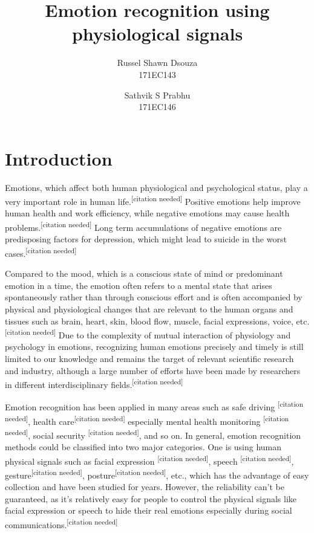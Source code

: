 \documentclass[11pt]{article}
\title{\textbf{Emotion recognition using physiological signals}}
\author{
  Russel Shawn Dsouza\\
  171EC143
  \and
  Sathvik S Prabhu\\
  171EC146
}
\date{}
\theoremstyle{definition}
\begin{document}
  \maketitle

  \section{Introduction}
    Emotions, which affect both human physiological and psychological status, play a very important role in human life.\textsuperscript{[citation needed]}
    Positive emotions help improve human health and work efficiency, while negative emotions may cause health problems.\textsuperscript{[citation needed]}
    Long term accumulations of negative emotions are predisposing factors for depression, which might lead to suicide in the worst cases.\textsuperscript{[citation needed]}

    Compared to the mood, which is a conscious state of mind or predominant emotion in a time, the emotion often refers to a mental state that arises spontaneously rather than through conscious effort and is often accompanied by physical and physiological changes that are relevant to the human organs and tissues such as brain, heart, skin, blood flow, muscle, facial expressions, voice, etc.\textsuperscript{[citation needed]}
    Due to the complexity of mutual interaction of physiology and psychology in emotions, recognizing human emotions precisely and timely is still limited to our knowledge and remains the target of relevant scientific research and industry, although a large number of efforts have been made by researchers in different interdisciplinary fields.\textsuperscript{[citation needed]}

    Emotion recognition has been applied in many areas such as safe driving \textsuperscript{[citation needed]}, health care\textsuperscript{[citation needed]} especially mental health monitoring \textsuperscript{[citation needed]}, social security \textsuperscript{[citation needed]}, and so on. 
    In general, emotion recognition methods could be classified into two major categories. 
    One is using human physical signals such as facial expression \textsuperscript{[citation needed]}, speech \textsuperscript{[citation needed]}, gesture\textsuperscript{[citation needed]}, posture\textsuperscript{[citation needed]}, etc., which has the advantage of easy collection and have been studied for years. 
    However, the reliability can’t be guaranteed, as it’s relatively easy for people to control the physical signals like facial expression or speech to hide their real emotions especially during social communications.\textsuperscript{[citation needed]}
\end{document}
